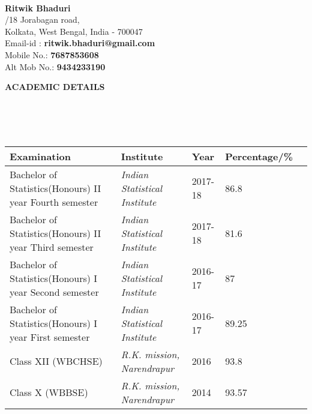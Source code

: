 \documentclass[a4paper,10pt]{article}
\newcommand{\lsep}{-0.5cm}
\newcommand{\resheading}[1]{{\small \colorbox{mygrey}{\begin{minipage}{0.975\textwidth}{\textbf{#1 \vphantom{p\^{E}}}}\end{minipage}}}}
\begin{document}
\hspace{0.5cm}\\[-0.2cm]

\textbf{\Large{Ritwik Bhaduri}} \\
/18 Jorabagan road, \\
\indent Kolkata, West Bengal, India - 700047\\
\indent Email-id : \textbf{ritwik.bhaduri@gmail.com} \\
\indent Mobile No.: \textbf{7687853608} \\
\indent Alt Mob No.: \textbf{9434233190} \\

\resheading{\textbf{ACADEMIC DETAILS} }\\[\lsep]
\\ \\
\indent \begin{tabular}{ l @{\hskip 0.15in} l @{\hskip 0.15in} l @{\hskip 0.15in} l @{\hskip 0.15in} l }
\hline
\textbf{Examination} & \textbf{Institute} & \textbf{Year} & \textbf{Percentage/\%} \\
\hline
Bachelor of Statistics(Honours) II year Fourth semester\,\, & \textit{Indian Statistical Institute} & 2017-18 & 86.8 \\
Bachelor of Statistics(Honours) II year Third semester\,\, & \textit{Indian Statistical Institute} & 2017-18 & 81.6 \\
Bachelor of Statistics(Honours) I year Second semester\,\, & \textit{Indian Statistical Institute} & 2016-17 & 87 \\
Bachelor of Statistics(Honours) I year First semester\,\, & \textit{Indian Statistical Institute} & 2016-17 & 89.25 \\
Class XII (WBCHSE)  & \textit{R.K. mission, Narendrapur} & 2016 & 93.8 \\
Class X (WBBSE) & \textit{R.K. mission, Narendrapur} & 2014 & 93.57\\
\hline
\end{tabular}
\\ \\
\end{document}
